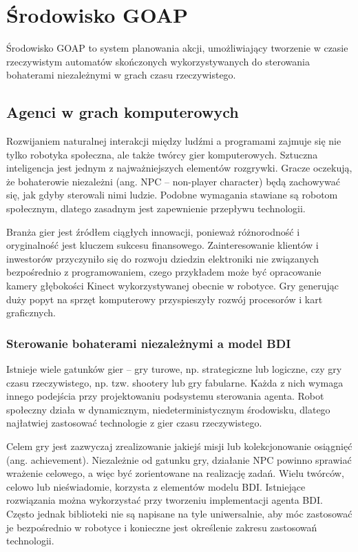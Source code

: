 \chapter{Środowisko GOAP}

Środowisko GOAP to system planowania akcji, umożliwiający tworzenie w czasie rzeczywistym automatów skończonych wykorzystywanych do sterowania bohaterami niezależnymi w grach czasu rzeczywistego. 

\section{Agenci w grach komputerowych}

Rozwijaniem naturalnej interakcji między ludźmi a programami zajmuje się nie tylko robotyka społeczna, ale także twórcy gier komputerowych. Sztuczna inteligencja jest jednym z najważniejszych elementów rozgrywki. Gracze oczekują, że bohaterowie niezależni (ang. NPC – non-player character) będą zachowywać się, jak gdyby sterowali nimi ludzie. Podobne wymagania stawiane są robotom społecznym, dlatego zasadnym jest zapewnienie przepływu technologii.

Branża gier jest źródłem ciągłych innowacji, ponieważ różnorodność i oryginalność jest kluczem sukcesu finansowego. Zainteresowanie klientów i inwestorów przyczyniło się do rozwoju dziedzin elektroniki nie związanych bezpośrednio z programowaniem, czego przykładem może być opracowanie kamery głębokości Kinect wykorzystywanej obecnie w robotyce. Gry generując duży popyt na sprzęt komputerowy przyspieszyły rozwój procesorów i kart graficznych.  

\subsection{Sterowanie bohaterami niezależnymi a model BDI}
Istnieje wiele gatunków gier – gry turowe, np. strategiczne lub logiczne, czy gry czasu rzeczywistego, np. tzw. shootery lub gry fabularne. Każda z nich wymaga innego podejścia przy projektowaniu podsystemu sterowania agenta. Robot społeczny działa w dynamicznym, niedeterministycznym środowisku, dlatego najłatwiej zastosować technologie z gier czasu rzeczywistego.

Celem gry jest zazwyczaj zrealizowanie jakiejś misji lub kolekcjonowanie osiągnięć (ang. achievement). Niezależnie od gatunku gry, działanie NPC powinno sprawiać wrażenie celowego, a więc być zorientowane na realizację zadań. Wielu twórców, celowo lub nieświadomie, korzysta z elementów modelu BDI. Istniejące rozwiązania można wykorzystać przy tworzeniu implementacji agenta BDI.
Często jednak biblioteki nie są napisane na tyle uniwersalnie, aby móc zastosować je bezpośrednio w robotyce i konieczne jest określenie zakresu zastosowań technologii.

